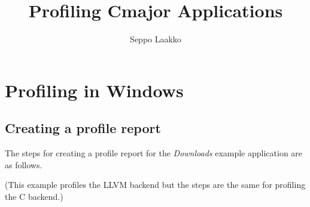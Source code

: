 \documentclass[oneside, a4paper, 11pt]{article}
\begin{document}
\title{Profiling Cmajor Applications}
\author{Seppo Laakko}
\maketitle

\section{Profiling in Windows}

\subsection{Creating a profile report}

The steps for creating a profile report
for the \emph{Downloads} example application are as follows.

(This example profiles the LLVM backend
but the steps are the same for profiling the C backend.)
\end{document}
